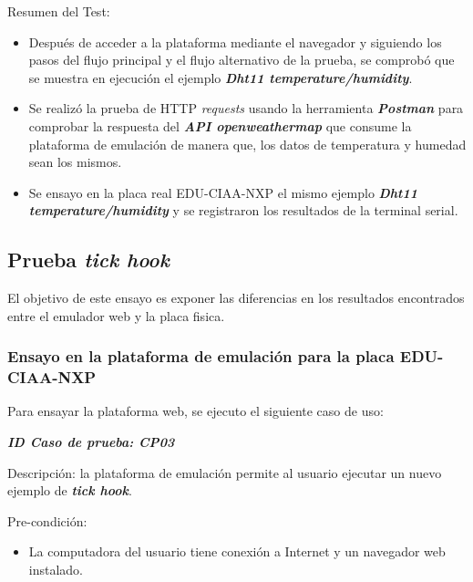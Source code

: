 Resumen del Test:
\begin{itemize}
	\item Después de acceder a la plataforma mediante el navegador y siguiendo los pasos del flujo principal y el flujo alternativo de la prueba, se comprobó que se muestra en ejecución el ejemplo \textit{\textbf{Dht11 temperature/humidity}}.
	\item Se realizó la prueba de HTTP \textit{requests} usando la herramienta \textit{\textbf{Postman}} para comprobar la respuesta del \textit{\textbf{API openweathermap}} que consume la plataforma de emulación de manera que, los datos de temperatura y humedad sean los mismos.
	\item Se ensayo en la placa real EDU-CIAA-NXP  el mismo ejemplo \textit{\textbf{Dht11 temperature/humidity}} y se registraron los resultados de la terminal serial.

\end{itemize}


\subsection{ Prueba \textit{\textbf{tick hook}}}
El objetivo de este ensayo es exponer las diferencias en los resultados encontrados entre el emulador web y la placa fisica.

\subsubsection{Ensayo en la plataforma de emulación para la placa EDU-CIAA-NXP} 
Para ensayar la plataforma web, se ejecuto el siguiente caso de uso:

\textit{\textbf{ID Caso de prueba: CP03}}

Descripción: la plataforma de emulación permite al usuario ejecutar un nuevo ejemplo de \textit{\textbf{tick hook}}.

Pre-condición: 
\begin{itemize}
	\item La computadora del usuario tiene conexión a Internet y un navegador web instalado.
\end{itemize}

